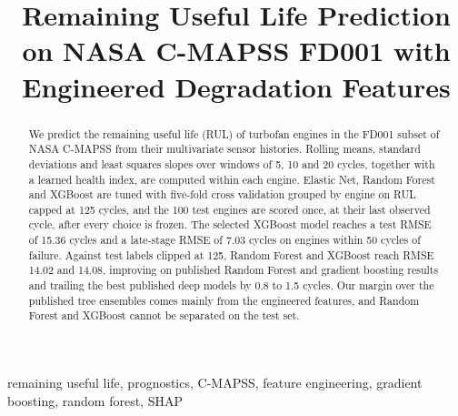 \documentclass[conference]{IEEEtran}
\begin{document}
\title{Remaining Useful Life Prediction on NASA C-MAPSS FD001 with Engineered Degradation Features}

\author{
}

\maketitle

\begin{abstract}
We predict the remaining useful life (RUL) of turbofan engines in the FD001
subset of NASA C-MAPSS from their multivariate sensor histories. Rolling
means, standard deviations and least squares slopes over windows of 5, 10
and 20 cycles, together with a learned health index, are computed within
each engine. Elastic Net, Random Forest and XGBoost are tuned with
five-fold cross validation grouped by engine on RUL capped at 125 cycles,
and the 100 test engines are scored once, at their last observed cycle,
after every choice is frozen. The selected XGBoost model reaches a test
RMSE of 15.36 cycles and a late-stage RMSE of 7.03 cycles on engines within
50 cycles of failure. Against test labels clipped at 125, Random Forest and
XGBoost reach RMSE 14.02 and 14.08, improving on published Random Forest
and gradient boosting results and trailing the best published deep models
by 0.8 to 1.5 cycles. Our margin over the published tree ensembles comes
mainly from the engineered features, and Random Forest and XGBoost cannot
be separated on the test set.
\end{abstract}

\begin{IEEEkeywords}
remaining useful life, prognostics, C-MAPSS, feature engineering, gradient
boosting, random forest, SHAP
\end{IEEEkeywords}














\end{document}
